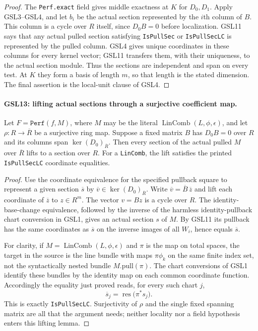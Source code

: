 \begin{proof}
The \texttt{Perf.exact} field gives middle exactness at $K$ for
$D_0,D_1$.  Apply GSL3--GSL4, and let $b_i$ be the actual section
represented by the $i$th column of $B$.  This column is a cycle
over $R$ itself, since $D_0B=0$ before localization.  GSL11 says
that any actual pulled section satisfying \texttt{IsPullSec} or
\texttt{IsPullSecLC} is represented by the pulled column.  GSL4
gives unique coordinates in these columns for every kernel vector;
GSL11 transfers them, with their uniqueness, to the actual section
module.  Thus the sections are independent and span on every test.
At $K$ they form a basis of length $m$, so that length is the stated
dimension.  The final assertion is the local-unit clause of GSL4.
\end{proof}

\paragraph{GSL13: lifting actual sections through a surjective coefficient map.}
\label{claim:GSL13}
Let $F=\texttt{Perf}(f,M)$, where $M$ may be the literal
$\operatorname{LinComb}(L,\phi,\epsilon)$, and let
$\rho:R\to\overline R$ be a surjective ring map.  Suppose a fixed
matrix $B$ has $D_0B=0$ over $R$ and its columns span
$\ker(D_0)_{\overline R}$.  Then every section of the actual pulled
$M$ over $\overline R$ lifts to a section over $R$.  For a
\texttt{LinComb}, the lift satisfies the printed
\texttt{IsPullSecLC} coordinate equalities.

\begin{proof}
Use the coordinate equivalence for the specified pullback square
to represent a given section $\overline s$ by
$\overline v\in\ker(D_0)_{\overline R}$.  Write
$\overline v=\overline B\,\overline z$ and lift each coordinate
of $\overline z$ to $z\in R^m$.  The vector $v=Bz$ is a cycle
over $R$.  The identity-base-change equivalence, followed by the
inverse of the harmless identity-pullback chart conversion in GSL1,
gives an actual section $s$ of $M$.  By GSL11 its pullback has the
same coordinates as $\overline s$ on the inverse images of all
$W_i$, hence equals $\overline s$.

For clarity, if $M=\operatorname{LinComb}(L,\phi,\epsilon)$ and
$\pi$ is the map on total spaces, the target in the source is the
line bundle with maps $\pi\phi_k$ on the same finite index set, not
the syntactically nested bundle $M.\mathrm{pull}(\pi)$.  The chart
conversions of GSL1 identify these bundles by the identity map on
each common coordinate function.  Accordingly the equality just
proved reads, for every such chart $j$,
\[
 \overline s_j
   =\operatorname{res}\bigl(\pi^*s_j\bigr).
 \tag{GSL.7}
\]
This is exactly \texttt{IsPullSecLC}.  Surjectivity of $\rho$ and
the single fixed spanning matrix are all that the argument needs;
neither locality nor a field hypothesis enters this lifting lemma.
\end{proof}


